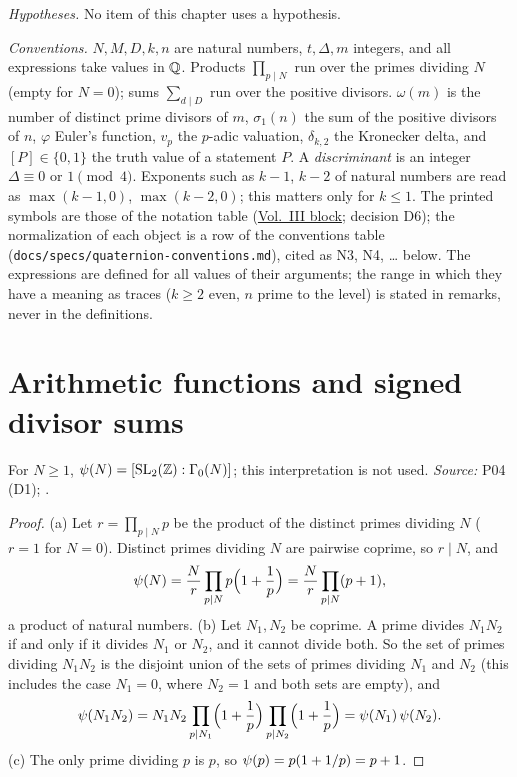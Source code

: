 \noindent\emph{Hypotheses.} No item of this chapter uses a hypothesis.

\noindent\emph{Conventions.} $N,M,D,k,n$ are natural numbers, $t,\Delta,m$ integers, and all expressions take values in $\mathbb{Q}$. Products $\prod_{p\mid N}$
run over the primes dividing $N$ (empty for $N=0$); sums $\sum_{d\mid D}$ run over the positive divisors. $\omega(m)$ is the number of distinct
prime divisors of $m$, $\sigma_1(n)$ the sum of the positive divisors of $n$, $\varphi$ Euler's function, $v_p$ the $p$-adic valuation, $\delta_{k,2}$
the Kronecker delta, and $[P]\in\{0,1\}$ the truth value of a statement $P$. A \emph{discriminant} is an integer $\Delta\equiv0$ or $1\pmod4$. Exponents
such as $k-1$, $k-2$ of natural numbers are read as $\max(k-1,0)$, $\max(k-2,0)$; this matters only for $k\le1$. The printed symbols are those of
the notation table (\hyperref[notation:q1]{Vol.~III block}; decision D6); the normalization of each object is a row of the conventions table
(\texttt{docs/specs/quaternion-conventions.md}), cited as N3, N4, \dots{} below. The expressions are defined for all values of their arguments; the
range in which they have a meaning as traces ($k\ge2$ even, $n$ prime to the level) is stated in remarks, never in the definitions.

\section{Arithmetic functions and signed divisor sums}\label{sec:ef-arith}

\begin{definition}
\end{definition}
\noindent For $N\ge1$, $\psi(N)=[\mathrm{SL}_2(\mathbb{Z}):\Gamma_0(N)]$; this interpretation is not used. \emph{Source:} P04 (D1); \cite[Thm.~12.4.11]{CoSt}.

\begin{lemma}
\end{lemma}
\begin{proof}
(a) Let $r=\prod_{p\mid N}p$ be the product of the distinct primes dividing $N$ ($r=1$ for $N=0$). Distinct primes dividing $N$ are pairwise
coprime, so $r\mid N$, and
\[
  \psi(N)=\frac Nr\prod_{p\mid N}p\Bigl(1+\frac1p\Bigr)=\frac Nr\prod_{p\mid N}(p+1),
\]
a product of natural numbers.
(b) Let $N_1,N_2$ be coprime. A prime divides $N_1N_2$ if and only if it divides $N_1$ or $N_2$, and it cannot divide both. So the set of primes
dividing $N_1N_2$ is the disjoint union of the sets of primes dividing $N_1$ and $N_2$ (this includes the case $N_1=0$, where $N_2=1$ and both sets
are empty), and
\[
  \psi(N_1N_2)=N_1N_2\prod_{p\mid N_1}\Bigl(1+\frac1p\Bigr)\prod_{p\mid N_2}\Bigl(1+\frac1p\Bigr)=\psi(N_1)\,\psi(N_2).
\]
(c) The only prime dividing $p$ is $p$, so $\psi(p)=p(1+1/p)=p+1$.
\end{proof}

